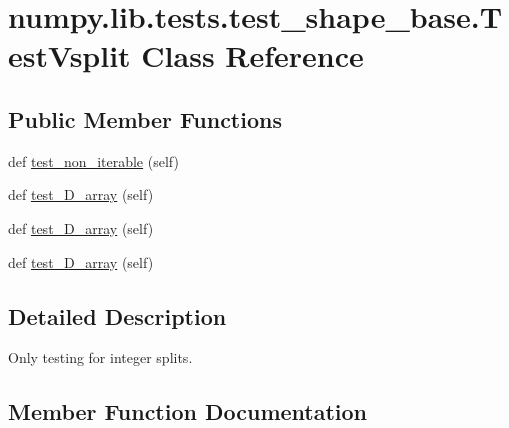 \hypertarget{classnumpy_1_1lib_1_1tests_1_1test__shape__base_1_1TestVsplit}{}\section{numpy.\+lib.\+tests.\+test\+\_\+shape\+\_\+base.\+Test\+Vsplit Class Reference}
\label{classnumpy_1_1lib_1_1tests_1_1test__shape__base_1_1TestVsplit}
\subsection*{Public Member Functions}
\begin{DoxyCompactItemize}
\item 
def \hyperlink{classnumpy_1_1lib_1_1tests_1_1test__shape__base_1_1TestVsplit_ab7614e7c25738b54771dc34b8e413fbf}{test\+\_\+non\+\_\+iterable} (self)
\item 
def \hyperlink{classnumpy_1_1lib_1_1tests_1_1test__shape__base_1_1TestVsplit_a4242a59585389cdb4db349386c27068b}{test\+\_\+D\+\_\+array} (self)
\item 
def \hyperlink{classnumpy_1_1lib_1_1tests_1_1test__shape__base_1_1TestVsplit_acf7fe104b301989e4f87dc1884f30e87}{test\+\_\+D\+\_\+array} (self)
\item 
def \hyperlink{classnumpy_1_1lib_1_1tests_1_1test__shape__base_1_1TestVsplit_a668624a62b5d2128bca3e577ca671f5a}{test\+\_\+D\+\_\+array} (self)
\end{DoxyCompactItemize}


\subsection{Detailed Description}
\begin{DoxyVerb}Only testing for integer splits.\end{DoxyVerb}
 

\subsection{Member Function Documentation}
\mbox{\label{classnumpy_1_1lib_1_1tests_1_1test__shape__base_1_1TestVsplit_a4242a59585389cdb4db349386c27068b}} 
